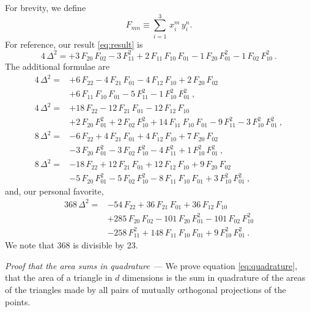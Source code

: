 \documentclass[10pt]{article}
\renewcommand{\paragraph}[1]{\par\addvspace{1em}\noindent\textsl{#1}~---}
\begin{document}
For brevity, we define
\begin{equation}
    F_{mn} \equiv \sum_{i=1}^{3} \, x_i^m \, y_i^n.
\end{equation}
For reference, our result \eqref{eq:result} is
\begin{equation}
4\,\Delta^2 =
+3\,F_{20}\,F_{02}
-3\,F_{11}^2
+2\,F_{11}\,F_{10}\,F_{01}
-1\,F_{20}\,F_{01}^2
-1\,F_{02}\,F_{10}^2~.
\end{equation}
The additional formulae are
\begin{align}
4\,\Delta^2 =
&
+6\,F_{22}
-4\,F_{21}\,F_{01}
-4\,F_{12}\,F_{10}
+2\,F_{20}\,F_{02}
\nonumber\\ &
+6\,F_{11}\,F_{10}\,F_{01}
-5\,F_{11}^2
-1\,F_{10}^2\,F_{01}^2~,
\\
4\,\Delta^2 =
&
+18\,F_{22}
-12\,F_{21}\,F_{01}
-12\,F_{12}\,F_{10}
\nonumber\\ &
+2\,F_{20}\,F_{01}^2
+2\,F_{02}\,F_{10}^2
+14\,F_{11}\,F_{10}\,F_{01}
-9\,F_{11}^2
-3\,F_{10}^2\,F_{01}^2~,
\\
8\,\Delta^2 =
&
-6\,F_{22}
+4\,F_{21}\,F_{01}
+4\,F_{12}\,F_{10}
+7\,F_{20}\,F_{02}
\nonumber\\ &
-3\,F_{20}\,F_{01}^2
-3\,F_{02}\,F_{10}^2
-4\,F_{11}^2
+1\,F_{10}^2\,F_{01}^2~,
\\
8\,\Delta^2 =
&
-18\,F_{22}
+12\,F_{21}\,F_{01}
+12\,F_{12}\,F_{10}
+9\,F_{20}\,F_{02}
\nonumber\\ &
-5\,F_{20}\,F_{01}^2
-5\,F_{02}\,F_{10}^2
-8\,F_{11}\,F_{10}\,F_{01}
+3\,F_{10}^2\,F_{01}^2~,
\end{align}
and, our personal favorite,
\begin{align}
368\,\Delta^2 =
&
-54\,F_{22}
+36\,F_{21}\,F_{01}
+36\,F_{12}\,F_{10}
\nonumber\\ &
+285\,F_{20}\,F_{02}
-101\,F_{20}\,F_{01}^2
-101\,F_{02}\,F_{10}^2
\nonumber\\ &
-258\,F_{11}^2
+148\,F_{11}\,F_{10}\,F_{01}
+9\,F_{10}^2\,F_{01}^2~.
\end{align}
We note that 368 is divisible by 23.

\paragraph{Proof that the area sums in quadrature} We prove equation \eqref{eq:quadrature}, that the area of a triangle in $d$ dimensions is the sum in quadrature of the areas of the triangles made by all pairs of mutually orthogonal projections of the points.
\end{document}
